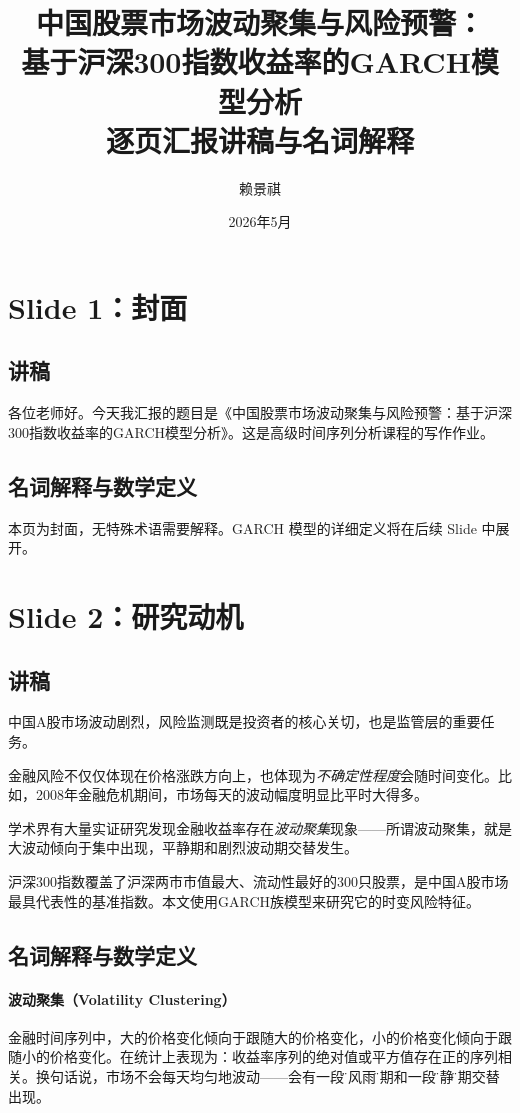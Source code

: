 \documentclass[11pt,a4paper]{article}
\title{中国股票市场波动聚集与风险预警：\\基于沪深300指数收益率的GARCH模型分析\\[1em]
\large 逐页汇报讲稿与名词解释}
\author{赖景祺}
\date{2026年5月}
\begin{document}
\maketitle
\tableofcontents
\newpage

\section*{Slide 1：封面}

\subsection*{讲稿}
各位老师好。今天我汇报的题目是《中国股票市场波动聚集与风险预警：基于沪深300指数收益率的GARCH模型分析》。这是高级时间序列分析课程的写作作业。

\subsection*{名词解释与数学定义}
本页为封面，无特殊术语需要解释。GARCH 模型的详细定义将在后续 Slide 中展开。

\newpage
\section*{Slide 2：研究动机}

\subsection*{讲稿}
中国A股市场波动剧烈，风险监测既是投资者的核心关切，也是监管层的重要任务。

金融风险不仅仅体现在价格涨跌方向上，也体现为\emph{不确定性程度}会随时间变化。比如，2008年金融危机期间，市场每天的波动幅度明显比平时大得多。

学术界有大量实证研究发现金融收益率存在\emph{波动聚集}现象——所谓波动聚集，就是大波动倾向于集中出现，平静期和剧烈波动期交替发生。

沪深300指数覆盖了沪深两市市值最大、流动性最好的300只股票，是中国A股市场最具代表性的基准指数。本文使用GARCH族模型来研究它的时变风险特征。

\subsection*{名词解释与数学定义}

\paragraph{波动聚集（Volatility Clustering）} 金融时间序列中，大的价格变化倾向于跟随大的价格变化，小的价格变化倾向于跟随小的价格变化。在统计上表现为：收益率序列的绝对值或平方值存在正的序列相关。换句话说，市场不会每天均匀地波动——会有一段\"暴风雨\"时期和一段\"平静\"时期交替出现。
\end{document}
